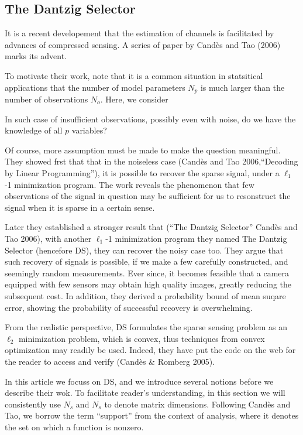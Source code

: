 \subsection{The Dantzig Selector}

It is a recent developement that the estimation of channels is facilitated by advances of compressed sensing.
A series of paper by Cand\`es and Tao (2006) marks its advent.

To motivate their work, note that it is a common situation in statsitical applications that the number of model parameters \(N_p\) is much larger than the number of observations \(N_o\).
Here, we consider


In such case of insufficient observations, possibly even with noise, do we have the knowledge of all \(p\) variables?



Of course, more assumption must be made to make the question meaningful.
They showed frst that that in the noiseless case (Cand\`es and Tao 2006,``Decoding by Linear Programming''), it is possible to recover the sparse signal, under a \(\ell_1\)-1 minimization program.
The work reveals the phenomenon that few observations of the signal in question may be sufficient for us to resonstruct the signal when it is sparse in a certain sense.

Later they established a stronger result that (``The Dantzig Selector'' Cand\`es and Tao 2006), with another \(\ell_1\)-1 minimization program they named The Dantzig Selector (hencefore DS), they can recover the noisy case too.
They argue that such recovery of signals is possible, if we make a few carefully constructed, and seemingly random measurements.
Ever since, it becomes feasible that a camera equipped with few sensors may obtain high quality images, greatly reducing the subsequent cost.
In addition, they derived a probability bound of mean suqare error, showing the probability of successful recovery is overwhelming.

From the realistic perspective, DS formulates the sparse sensing problem as an \(\ell_2\) minimization problem, which is convex, thus techniques from convex optimization may readily be used.
Indeed, they have put the code on the web for the reader to access and verify (Cand\`es \& Romberg 2005).

In this article we focuss on DS, and we introduce several notions before we describe their wok.
To facilitate reader's understanding, in this section we will consistently use \(N_s\) and \(N_s\) to denote matrix dimensions.
Following Cand\`es and Tao, we borrow the term ``support'' from the context of analysis, where it denotes the set on which a function is nonzero.

